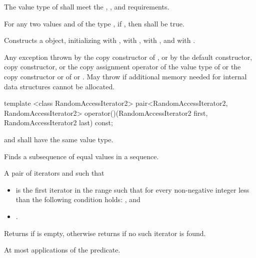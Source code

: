 \begin{itemdescr}
\pnum
\requires
The value type of  shall meet the , , and  requirements.

\pnum
\requires
For any two values  and  of the type ,
if , then  shall be true.

\pnum
\effects
Constructs a  object, initializing  with ,
 with ,  with , and  with .

\pnum
\throws
Any exception thrown by the copy constructor of ,
or by the default constructor, copy constructor, or the copy assignment operator of the value type of 
or the copy constructor or  of  or .
May throw  if additional memory needed for internal data structures cannot be allocated.
\end{itemdescr}

%
\begin{itemdecl}
template <class RandomAccessIterator2>
  pair<RandomAccessIterator2, RandomAccessIterator2>
    operator()(RandomAccessIterator2 first, RandomAccessIterator2 last) const;
\end{itemdecl}

\begin{itemdescr}
\pnum
\requires
{} and  shall have the same value type.

\pnum
\effects
Finds a subsequence of equal values in a sequence.

\pnum
\returns
A pair of iterators  and  such that
\begin{itemize}
\item {} is the first iterator  in the range
 such that
for every non-negative integer  less than 
the following condition holds:
, and
\item {}.
\end{itemize}
Returns  if  is empty,
otherwise returns  if no such iterator is found.

\pnum
\complexity
At most  applications of the predicate.
\end{itemdescr}

